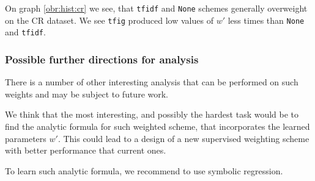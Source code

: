     On graph \ref{obr:hist:cr} we see, that \texttt{tfidf} and \texttt{None} schemes generally overweight on the CR dataset.
    We see \texttt{tfig} produced low values of $w'$ less times than \texttt{None} and \texttt{tfidf}.
    
    \subsubsection{Possible further directions for analysis}
    
    There is a number of other interesting analysis that can be performed on such weights and may be subject to future work.
    
    We think that the most interesting, and possibly the hardest task would be to find the analytic formula for such weighted scheme, that incorporates the learned parameters $w'$. 
    This could lead to a design of a new supervised weighting scheme with better performance that current ones.
    
    To learn such analytic formula, we recommend to use symbolic regression.
